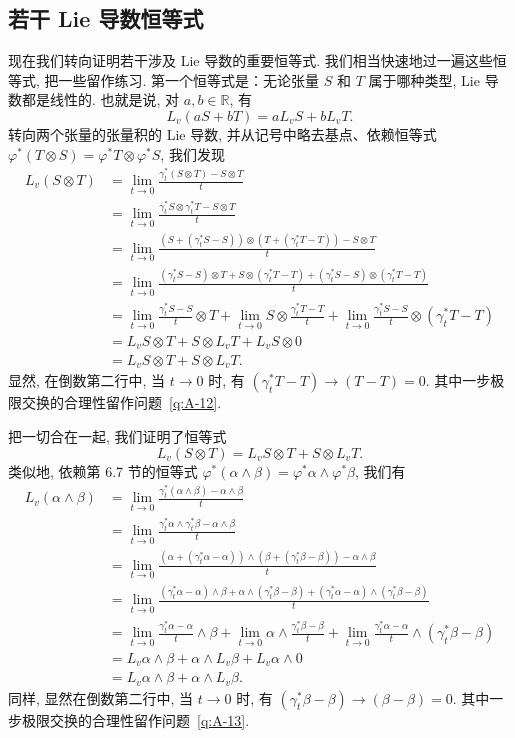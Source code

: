 \subsection{若干 Lie 导数恒等式}

现在我们转向证明若干涉及 Lie 导数的重要恒等式. 我们相当快速地过一遍这些恒等式, 把一些留作练习. 第一个恒等式是：无论张量 $S$ 和 $T$ 属于哪种类型, Lie 导数都是线性的. 也就是说, 对 $a,b\in\mathbb{R}$, 有
\[
L_v\left(aS+bT\right)=aL_vS+bL_vT.
\]
转向两个张量的张量积的 Lie 导数, 并从记号中略去基点、依赖恒等式 $\varphi^*\left(T\otimes S\right)=\varphi^*T\otimes\varphi^*S$, 我们发现
\begin{align*}
L_v(S\otimes T)&=\lim_{t\to0}\frac{\gamma_t^*(S\otimes T)-S\otimes T}{t}\\
&=\lim_{t\to0}\frac{\gamma_t^*S\otimes\gamma_t^*T-S\otimes T}{t}\\
&=\lim_{t\to0}\frac{\left(S+(\gamma_t^*S-S)\right)\otimes\left(T+(\gamma_t^*T-T)\right)-S\otimes T}{t}\\
&=\lim_{t\to0}\frac{(\gamma_t^*S-S)\otimes T+S\otimes(\gamma_t^*T-T)+(\gamma_t^*S-S)\otimes(\gamma_t^*T-T)}{t}\\
&=\lim_{t\to0}\frac{\gamma_t^*S-S}{t}\otimes T+\lim_{t\to0}S\otimes\frac{\gamma_t^*T-T}{t}+\lim_{t\to0}\frac{\gamma_t^*S-S}{t}\otimes(\gamma_t^*T-T)\\
&=L_vS\otimes T+S\otimes L_vT+L_vS\otimes0\\
&=L_vS\otimes T+S\otimes L_vT.
\end{align*}
显然, 在倒数第二行中, 当 $t\to0$ 时, 有 $(\gamma_t^*T-T)\to(T-T)=0$. 其中一步极限交换的合理性留作问题~\ref{q:A-12}.

把一切合在一起, 我们证明了恒等式
\[
L_v(S\otimes T)=L_vS\otimes T+S\otimes L_vT.
\]
类似地, 依赖第 6.7 节的恒等式 $\varphi^*(\alpha\wedge\beta)=\varphi^*\alpha\wedge\varphi^*\beta$, 我们有
\begin{align*}
L_v(\alpha\wedge\beta)&=\lim_{t\to0}\frac{\gamma_t^*(\alpha\wedge\beta)-\alpha\wedge\beta}{t}\\
&=\lim_{t\to0}\frac{\gamma_t^*\alpha\wedge\gamma_t^*\beta-\alpha\wedge\beta}{t}\\
&=\lim_{t\to0}\frac{\left(\alpha+(\gamma_t^*\alpha-\alpha)\right)\wedge\left(\beta+(\gamma_t^*\beta-\beta)\right)-\alpha\wedge\beta}{t}\\
&=\lim_{t\to0}\frac{(\gamma_t^*\alpha-\alpha)\wedge\beta+\alpha\wedge(\gamma_t^*\beta-\beta)+(\gamma_t^*\alpha-\alpha)\wedge(\gamma_t^*\beta-\beta)}{t}\\
&=\lim_{t\to0}\frac{\gamma_t^*\alpha-\alpha}{t}\wedge\beta+\lim_{t\to0}\alpha\wedge\frac{\gamma_t^*\beta-\beta}{t}+\lim_{t\to0}\frac{\gamma_t^*\alpha-\alpha}{t}\wedge(\gamma_t^*\beta-\beta)\\
&=L_v\alpha\wedge\beta+\alpha\wedge L_v\beta+L_v\alpha\wedge0\\
&=L_v\alpha\wedge\beta+\alpha\wedge L_v\beta.
\end{align*}
同样, 显然在倒数第二行中, 当 $t\to0$ 时, 有 $(\gamma_t^*\beta-\beta)\to(\beta-\beta)=0$. 其中一步极限交换的合理性留作问题~\ref{q:A-13}.

